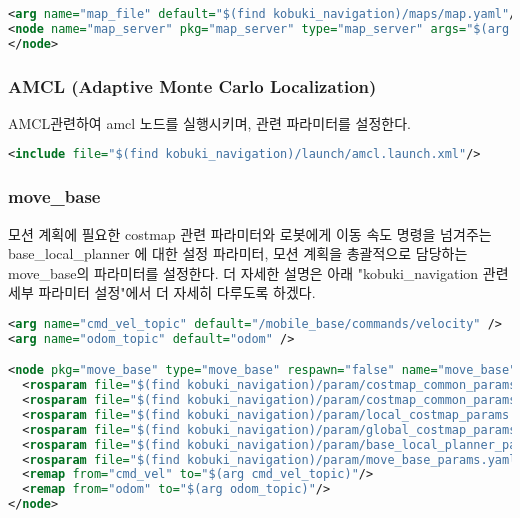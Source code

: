 \vspace{\baselineskip}
\begin{lstlisting}[language=XML]
<arg name="map_file" default="$(find kobuki_navigation)/maps/map.yaml"/>
<node name="map_server" pkg="map_server" type="map_server" args="$(arg map_file)">
</node>
\end{lstlisting}

\subsubsection{AMCL (Adaptive Monte Carlo Localization)}
AMCL관련하여 amcl 노드를 실행시키며, 관련 파라미터를 설정한다.

\vspace{\baselineskip}
\begin{lstlisting}[language=XML]
<include file="$(find kobuki_navigation)/launch/amcl.launch.xml"/>
\end{lstlisting}

\subsubsection{move\_base}
모션 계획에 필요한 costmap 관련 파라미터와 로봇에게 이동 속도 명령을 넘겨주는 base\_local\_planner 에 대한 설정 파라미터, 모션 계획을 총괄적으로 담당하는 move\_base의 파라미터를 설정한다. 더 자세한 설명은 아래 "kobuki\_navigation 관련 세부 파라미터 설정"에서 더 자세히 다루도록 하겠다.

\vspace{\baselineskip}
\begin{lstlisting}[language=XML]
<arg name="cmd_vel_topic" default="/mobile_base/commands/velocity" />
<arg name="odom_topic" default="odom" />

<node pkg="move_base" type="move_base" respawn="false" name="move_base" output="screen">
  <rosparam file="$(find kobuki_navigation)/param/costmap_common_params.yaml" command="load" ns="global_costmap" />
  <rosparam file="$(find kobuki_navigation)/param/costmap_common_params.yaml" command="load" ns="local_costmap" />
  <rosparam file="$(find kobuki_navigation)/param/local_costmap_params.yaml" command="load" />
  <rosparam file="$(find kobuki_navigation)/param/global_costmap_params.yaml" command="load" />
  <rosparam file="$(find kobuki_navigation)/param/base_local_planner_params.yaml" command="load" />
  <rosparam file="$(find kobuki_navigation)/param/move_base_params.yaml" command="load" />
  <remap from="cmd_vel" to="$(arg cmd_vel_topic)"/>
  <remap from="odom" to="$(arg odom_topic)"/>
</node>
\end{lstlisting}

